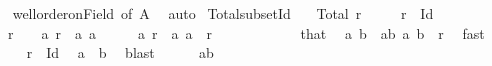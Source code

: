 \begin{isabellebody}
%
\isadelimproof
\ \ %
\endisadelimproof
%
\isatagproof
{}\isamarkupfalse%
\ well{\isacharunderscore}{\kern0pt}order{\isacharunderscore}{\kern0pt}on{\isacharunderscore}{\kern0pt}Field\ {\isacharbrackleft}{\kern0pt}of\ A{\isacharbrackright}{\kern0pt}\ \isamarkupfalse%
\ auto%
\endisatagproof
{\isafoldproof}%
%
\isadelimproof
\isanewline
%
\endisadelimproof
\isanewline
{}\isamarkupfalse%
\ Total{\isacharunderscore}{\kern0pt}subset{\isacharunderscore}{\kern0pt}Id{\isacharcolon}{\kern0pt}\isanewline
\ \ \ {\isachardoublequoteopen}Total\ r{\isachardoublequoteclose}\isanewline
\ \ \ \ \ {\isachardoublequoteopen}r\ {\isasymsubseteq}\ Id{\isachardoublequoteclose}\isanewline
\ \ \ {\isachardoublequoteopen}r\ {\isacharequal}{\kern0pt}\ {\isacharbraceleft}{\kern0pt}{\isacharbraceright}{\kern0pt}\ {\isasymor}\ {\isacharparenleft}{\kern0pt}{\isasymexists}a{\isachardot}{\kern0pt}\ r\ {\isacharequal}{\kern0pt}\ {\isacharbraceleft}{\kern0pt}{\isacharparenleft}{\kern0pt}a{\isacharcomma}{\kern0pt}\ a{\isacharparenright}{\kern0pt}{\isacharbraceright}{\kern0pt}{\isacharparenright}{\kern0pt}{\isachardoublequoteclose}\isanewline
%
\isadelimproof
%
\endisadelimproof
%
\isatagproof
{}\isamarkupfalse%
\ {\isacharminus}{\kern0pt}\isanewline
\ \ \isamarkupfalse%
\ {\isachardoublequoteopen}{\isasymexists}a{\isachardot}{\kern0pt}\ r\ {\isacharequal}{\kern0pt}\ {\isacharbraceleft}{\kern0pt}{\isacharparenleft}{\kern0pt}a{\isacharcomma}{\kern0pt}\ a{\isacharparenright}{\kern0pt}{\isacharbraceright}{\kern0pt}{\isachardoublequoteclose}\ \ {\isachardoublequoteopen}r\ {\isasymnoteq}\ {\isacharbraceleft}{\kern0pt}{\isacharbraceright}{\kern0pt}{\isachardoublequoteclose}\isanewline
\ \ \isamarkupfalse%
\ {\isacharminus}{\kern0pt}\isanewline
\ \ \ \ \isamarkupfalse%
\ that\ \isamarkupfalse%
\ a\ b\ \ ab{\isacharcolon}{\kern0pt}\ {\isachardoublequoteopen}{\isacharparenleft}{\kern0pt}a{\isacharcomma}{\kern0pt}\ b{\isacharparenright}{\kern0pt}\ {\isasymin}\ r{\isachardoublequoteclose}\ \isamarkupfalse%
\ fast\isanewline
\ \ \ \ \isamarkupfalse%
\ {\isacartoucheopen}r\ {\isasymsubseteq}\ Id{\isacartoucheclose}\ \isamarkupfalse%
\ {\isachardoublequoteopen}a\ {\isacharequal}{\kern0pt}\ b{\isachardoublequoteclose}\ \isamarkupfalse%
\ blast\isanewline
\ \ \ \ \isamarkupfalse%
\ ab\ \isamarkupfalse%

\end{isabellebody}
